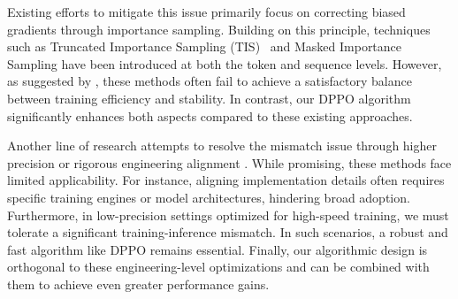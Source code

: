 Existing efforts to mitigate this issue primarily focus on correcting biased gradients through importance sampling. Building on this principle, techniques such as Truncated Importance Sampling (TIS)~\citep{yao2025offpolicy, zheng2025stabilizing} and Masked Importance Sampling \citep{liu-li-2025, team2025every} have been introduced at both the token and sequence levels. However, as suggested by \citet{qi2025defeating}, these methods often fail to achieve a satisfactory balance between training efficiency and stability. In contrast, our DPPO algorithm significantly enhances both aspects compared to these existing approaches.

Another line of research attempts to resolve the mismatch issue through higher precision \citep{qi2025defeating} or rigorous engineering alignment \citep{Team2025EveryAM, he2025nondeterminism, zhang2025deterministic}. While promising, these methods face limited applicability. For instance, aligning implementation details often requires specific training engines or model architectures, hindering broad adoption. Furthermore, in low-precision settings optimized for high-speed training, we must tolerate a significant training-inference mismatch. In such scenarios, a robust and fast algorithm like DPPO remains essential. Finally, our algorithmic design is orthogonal to these engineering-level optimizations and can be combined with them to achieve even greater performance gains.

